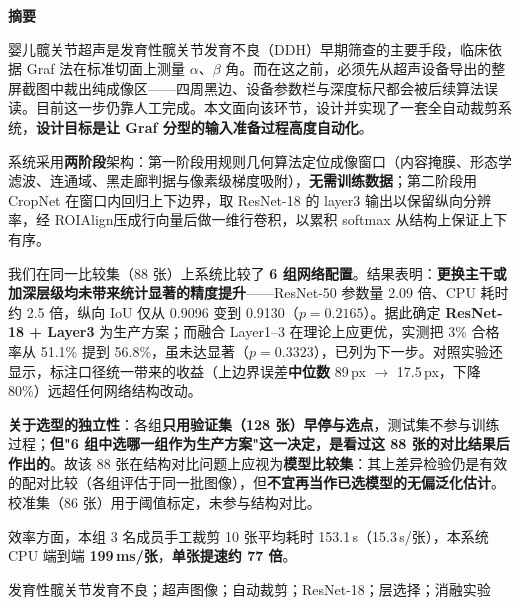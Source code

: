 \documentclass[UTF8,a4paper,10pt]{ctexart}
\begin{document}
\begin{center}
{\sffamily\bfseries\normalsize\color{navy} 摘\quad 要}
\end{center}
\vspace{-0.12cm}
{\small
\noindent 婴儿髋关节超声是发育性髋关节发育不良（DDH）早期筛查的主要手段，临床依据 Graf 法在标准切面上测量 $\alpha$、$\beta$ 角\cite{graf1984classification}。而在这之前，必须先从超声设备导出的整屏截图中裁出纯成像区——四周黑边、设备参数栏与深度标尺都会被后续算法误读。目前这一步仍靠人工完成。本文面向该环节，设计并实现了一套全自动裁剪系统，\textbf{设计目标是让 Graf 分型的输入准备过程高度自动化}。

\vspace{0.18em}
\noindent 系统采用\textbf{两阶段}架构：第一阶段用规则几何算法定位成像窗口（内容掩膜、形态学滤波、连通域、黑走廊判据与像素级梯度吸附），\textbf{无需训练数据}；第二阶段用 CropNet 在窗口内回归上下边界，取 ResNet-18 的 layer3 输出以保留纵向分辨率\cite{he2016resnet}，经 ROIAlign\cite{he2017maskrcnn}压成行向量后做一维行卷积，以累积 softmax 从结构上保证上下有序。

\vspace{0.18em}
\noindent 我们在同一比较集（88 张）上系统比较了 \textbf{6 组网络配置}。结果表明：\textbf{更换主干或加深层级均未带来统计显著的精度提升}——ResNet-50 参数量 2.09 倍、CPU 耗时约 2.5 倍，纵向 IoU 仅从 0.9096 变到 0.9130（$p=0.2165$）。据此确定 \textbf{ResNet-18 + Layer3} 为生产方案；而融合 Layer1--3 在理论上应更优，实测把 3\% 合格率从 51.1\% 提到 56.8\%，虽未达显著（$p=0.3323$），已列为下一步。对照实验还显示，标注口径统一带来的收益（上边界误差\textbf{中位数} 89\,px $\to$ 17.5\,px，下降 80\%）远超任何网络结构改动。

\noindent\textbf{关于选型的独立性}：各组\textbf{只用验证集（128 张）早停与选点}，测试集不参与训练过程；\textbf{但"6 组中选哪一组作为生产方案"这一决定，是看过这 88 张的对比结果后作出的}。故该 88 张在结构对比问题上应视为\textbf{模型比较集}：其上差异检验仍是有效的配对比较（各组评估于同一批图像），但\textbf{不宜再当作已选模型的无偏泛化估计}。校准集（86 张）用于阈值标定，未参与结构对比。

\vspace{0.18em}
\noindent 效率方面，本组 3 名成员手工裁剪 10 张平均耗时 153.1\,s（15.3\,s/张），本系统 CPU 端到端 \textbf{199\,ms/张}，\textbf{单张提速约 77 倍}。

\vspace{0.22em}
发育性髋关节发育不良；超声图像；自动裁剪；ResNet-18；层选择；消融实验

\vspace{0.12em}
}
\end{document}
